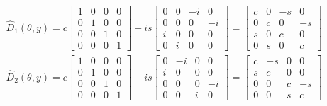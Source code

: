 \documentclass{article}
\begin{document}
\begin{enumerate}
\begin{enumerate}
{            \[
            \begin{aligned}
            & \hat{D}_{1}(\theta, y) = c \left[\begin{array}{cccc}
            1 & 0 & 0 & 0 \\
            0 & 1 & 0 & 0 \\
            0 & 0 & 1 & 0 \\
            0 & 0 & 0 & 1
            \end{array}\right] - i s \left[\begin{array}{cccc}
            0 & 0 & -i & 0 \\
            0 & 0 & 0 & -i \\
            i & 0 & 0 & 0 \\
            0 & i & 0 & 0
            \end{array}\right] = \left[\begin{array}{cccc}
            c & 0 & -s & 0 \\
            0 & c & 0 & -s \\
            s & 0 & c & 0 \\
            0 & s & 0 & c
            \end{array}\right] \\
            & \hat{D}_{2}(\theta, y) = c \left[\begin{array}{cccc}
            1 & 0 & 0 & 0 \\
            0 & 1 & 0 & 0 \\
            0 & 0 & 1 & 0 \\
            0 & 0 & 0 & 1
            \end{array}\right] - i s \left[\begin{array}{cccc}
            0 & -i & 0 & 0 \\
            i & 0 & 0 & 0 \\
            0 & 0 & 0 & -i \\
            0 & 0 & i & 0
            \end{array}\right] = \left[\begin{array}{cccc}
            c & -s & 0 & 0 \\
            s & c & 0 & 0 \\
            0 & 0 & c & -s \\
            0 & 0 & s & c
            \end{array}\right]
            \end{aligned}
            \]

}
\end{enumerate}
\end{enumerate}
\end{document}
